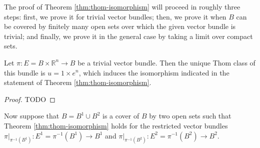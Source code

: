 \documentclass[10pt]{article}
\providecommand{\RR}{\mathbb R}
\providecommand{\inv}{^{-1}}
\begin{document}

The proof of Theorem \ref{thm:thom-isomorphism}
will proceed in roughly three steps:
first, we prove it for trivial vector bundles;
then, we prove it when $B$ can be covered by
finitely many open sets over which the given vector bundle is trivial;
and finally, we prove it in the general case
by taking a limit over compact sets.

\begin{lemma}
    \label{lem:thom-isomorphism-trivial-bundle}
    Let $\pi\colon E = B\times\RR^n\to B$ be a trivial vector bundle.
    Then the unique Thom class of this bundle is $u = 1\times e^n$,
    which induces the isomorphism indicated in the statement
    of Theorem \ref{thm:thom-isomorphism}.
\end{lemma}

\begin{proof}
    TODO
\end{proof}

Now suppose that $B = B^1 \cup B^2$ is a cover of $B$ by two open sets
such that Theorem \ref{thm:thom-isomorphism} holds for
the restricted vector bundles
$\pi|_{\pi\inv(B^1)}\colon E^1 = \pi\inv(B^1)\to B^1$ and
$\pi|_{\pi\inv(B^2)}\colon E^2 = \pi\inv(B^2)\to B^2$.
\end{document}
